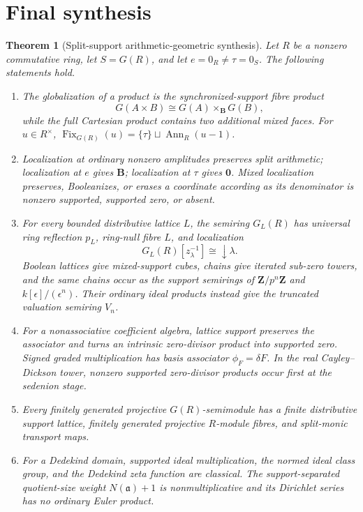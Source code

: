 \documentclass[11pt]{amsart}
\numberwithin{equation}{section}
\newtheorem{theorem}{Theorem}[section]
\theoremstyle{definition}
\newcommand{\B}{\mathbf B}
\newcommand{\Z}{\mathbf Z}
\newcommand{\zero}{\mathbf 0}
\newcommand{\Ann}{\operatorname{Ann}}
\begin{document}
\section{Final synthesis}
\label{sec:final-synthesis}

\begin{theorem}[Split-support arithmetic-geometric synthesis]
\label{thm:final-synthesis-v5}
Let $R$ be a nonzero commutative ring, let $S=G(R)$, and let
$e=0_R\neq\tau=0_S$.  The following statements hold.
\begin{enumerate}[label=\textup{(\arabic*)},leftmargin=3.2em]
\item The globalization of a product is the synchronized-support fibre
product
\[
G(A\times B)\cong G(A)\times_{\B}G(B),
\]
while the full Cartesian product contains two additional mixed faces.
For $u\in R^\times$,
$\operatorname{Fix}_{G(R)}(u)=\{\tau\}\sqcup\Ann_R(u-1)$.

\item Localization at ordinary nonzero amplitudes preserves split
arithmetic; localization at $e$ gives $\B$; localization at $\tau$ gives
$\zero$.  Mixed localization preserves, Booleanizes, or erases a coordinate
according as its denominator is nonzero supported, supported zero, or
absent.

\item For every bounded distributive lattice $L$, the semiring $G_L(R)$ has
universal ring reflection $p_L$, ring-null fibre $L$, and localization
\[
G_L(R)[z_\lambda^{-1}]\cong\downarrow\lambda.
\]
Boolean lattices give mixed-support cubes, chains give iterated sub-zero
towers, and the same chains occur as the support semirings of
$\Z/p^n\Z$ and $k[\epsilon]/(\epsilon^n)$.  Their ordinary ideal products
instead give the truncated valuation semiring $V_n$.

\item For a nonassociative coefficient algebra, lattice support preserves
the associator and turns an intrinsic zero-divisor product into supported
zero.  Signed graded multiplication has basis associator
$\phi_F=\delta F$.  In the real Cayley--Dickson tower, nonzero supported
zero-divisor products occur first at the sedenion stage.

\item Every finitely generated projective $G(R)$-semimodule has a finite
distributive support lattice, finitely generated projective $R$-module
fibres, and split-monic transport maps.

\item For a Dedekind domain, supported ideal multiplication, the normed
ideal class group, and the Dedekind zeta function are classical.  The
support-separated quotient-size weight $N(\mathfrak a)+1$ is
nonmultiplicative and its Dirichlet series has no ordinary Euler product.


\end{enumerate}
\end{theorem}
\end{document}
